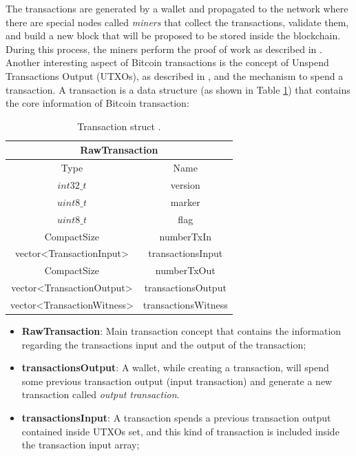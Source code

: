 The transactions are generated by a wallet and propagated to the network
where there are special nodes called \emph{miners} that collect the transactions,
validate them, and build a new block that will be proposed to be stored inside 
the blockchain. During this process, the miners perform the proof of work as 
described in \cite{Palazzo_Estrazione_di_Informazioni_2021}.
Another interesting aspect of Bitcoin transactions is the concept of 
Unspend Transactions Output (UTXOs), as described in \cite{nakamoto2009bitcoin},
and the mechanism to spend a transaction.
A transaction is a data structure (as shown in Table \ref{tab:rawtxbitcoinc}) that contains the core information
of Bitcoin transaction: 

\begin{table}[H]
    \centering\small
       \begin{tabular}{|c|c|}
        \hline
        \multicolumn{2}{|c|}{\textbf{RawTransaction}} \\
        \hline
        \multicolumn{1}{|c|}{Type} & \multicolumn{1}{c|}{Name} \\       
        \hline \hline
        $int32\_t$ & version   \\
        \hline
        $uint8\_t$ & marker \\
        \hline
        $uint8\_t$ & flag \\
        \hline
        CompactSize & numberTxIn \\
        \hline
        vector<TransactionInput> & transactionsInput \\
        \hline
        CompactSize & numberTxOut \\
        \hline
        vector<TransactionOutput> & transactionsOutput \\
        \hline
        vector<TransactionWitness> & transactionsWitness \\
        \hline
    \end{tabular}   
    \caption{Transaction struct \cite{Palazzo_Estrazione_di_Informazioni_2021}.\label{tab:rawtxbitcoinc}}
\end{table}

\begin{itemize}
    \item {\bf RawTransaction}: Main transaction concept that contains the information
        regarding the transactions input and the output of the transaction;
    \item {\bf transactionsOutput}: A wallet, while creating a transaction, will spend some previous
        transaction output (input transaction) and generate a new transaction called \emph{output transaction}.
    \item {\bf transactionsInput}: A transaction spends a previous transaction output contained
        inside UTXOs set, and this kind of transaction is included inside
        the transaction input array;
    \end{itemize}


